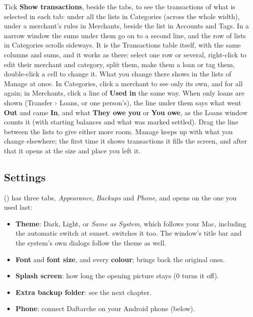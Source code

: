 \documentclass[11pt]{article}
\begin{document}
Tick \textbf{Show transactions}, beside the tabs, to see the transactions of what is selected in
each tab: under all the lists in Categories (across the whole width), under a merchant's rules in
Merchants, beside the list in Accounts and Tags. In a narrow window the sums under them go on to a
second line, and the row of lists in Categories scrolls sideways. It is the Transactions table itself, with the same columns and sums, and it
works as there: select one row or several, right-click to edit their merchant and category, split
them, make them a loan or tag them, double-click a cell to change it. What you change there shows
in the lists of Manage at once. In Categories, click a merchant to see only its own, and
 for all again; in Merchants, click a line of \textbf{Used in} the same way. When
only loans are shown (Transfer › Loans, or one person's), the line under them says what went
\textbf{Out} and came \textbf{In}, and what \textbf{They owe you} or \textbf{You owe}, as the Loans
window counts it (with starting balances and what was marked settled). Drag the line between the lists to give either more room. Manage
keeps up with what you change elsewhere; the first time it shows transactions it fills the screen,
and after that it opens at the size and place you left it.

\subsection{Settings}
 (\key{,}) has three tabs, \emph{Appearance}, \emph{Backups} and
\emph{Phone}, and opens on the one you used last:
\begin{itemize}
  \item \textbf{Theme}: Dark, Light, or \emph{Same as System}, which follows your Mac, including the
        automatic switch at sunset.  switches it too. The window's title
        bar and the system's own dialogs follow the theme as well.
  \item \textbf{Font} and \textbf{font size}, and every \textbf{colour}; 
        brings back the original ones.
  \item \textbf{Splash screen}: how long the opening picture stays (0 turns it off).
  \item \textbf{Extra backup folder}: see the next chapter.
  \item \textbf{Phone}: connect Daftarche on your Android phone (below).
\end{itemize}
\end{document}
